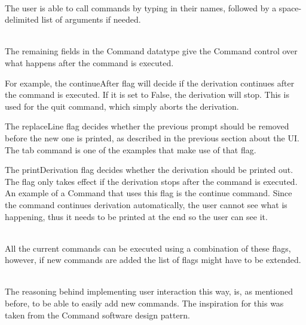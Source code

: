 \ \\
The user is able to call commands by typing in their names,
followed by a space-delimited list of arguments if needed.

\ \\
The remaining fields in the Command datatype give the Command control over what happens after the command is executed.

For example, the continueAfter flag will decide if the derivation continues after the command is executed.
If it is set to False, the derivation will stop.
This is used for the quit command, which simply aborts the derivation.

The replaceLine flag decides whether the previous prompt should be removed before the new one is printed,
as described in the previous section about the UI.
The tab command is one of the examples that make use of that flag.

The printDerivation flag decides whether the derivation should be printed out.
The flag only takes effect if the derivation stops after the command is executed.
An example of a Command that uses this flag is the continue command.
Since the command continues derivation automatically,
the user cannot see what is happening,
thus it needs to be printed at the end so the user can see it.

\ \\
All the current commands can be executed using a combination of these flags,
however, if new commands are added the list of flags might have to be extended.

\ \\
The reasoning behind implementing user interaction this way,
is, as mentioned before, to be able to easily add new commands.
The inspiration for this was taken from the Command software design pattern.
